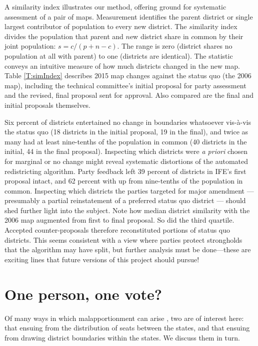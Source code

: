 \documentclass[letter,12pt]{article}
\begin{document}
A similarity index \citep[][:15--7]{cox.katz.2002} illustrates our method, offering ground for systematic assessment of a pair of maps. Measurement identifies the parent district or single largest contributor of population to every new district. The $s$imilarity index divides the population that $p$arent and $n$ew district share in $c$ommon by their joint population: $s = c / (p + n - c)$. The range is zero (district shares no population at all with parent) to one (districts are identical). The statistic conveys an intuitive measure of how much districts changed in the new map. Table \ref{T:simIndex} describes 2015 map changes against the status quo (the 2006 map), including the technical committee's initial proposal for party assessment and the revised, final proposal sent for approval. Also compared are the final and initial proposals themselves. 

Six percent of districts entertained no change in boundaries whatsoever vis-\`a-vis the status quo (18 districts in the initial proposal, 19 in the final), and twice as many had at least nine-tenths of the population in common (40 districts in the initial, 44 in the final proposal). Inspecting which districts were \emph{a priori} chosen for marginal or no change might reveal systematic distortions of the automated redistricting algorithm. Party feedback left 39 percent of districts in IFE's first proposal intact, and 62 percent with up from nine-tenths of the population in common. Inspecting which districts the parties targeted for major amendment --- presumably a partial reinstatement of a preferred status quo district --- should shed further light into the subject. Note how median district similarity with the 2006 map augmented from first to final proposal. So did the third quartile. Accepted counter-proposals therefore reconstituted portions of status quo districts. This seems consistent with a view where parties protect strongholds that the algorithm may have split, but further analysis must be done---these are exciting lines that future versions of this project should pursue!

\section{One person, one vote?}

Of many ways in which malapportionment can arise \citep{snyder.samuelsMalapp2004}, two are of interest here: that ensuing from the distribution of seats between the states, and that ensuing from drawing district boundaries within the states. We discuss them in turn.
\end{document}
